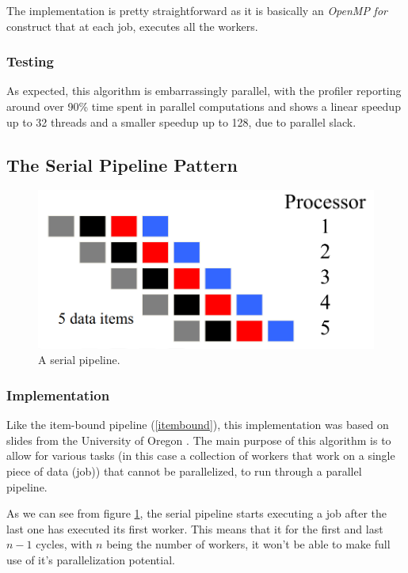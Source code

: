 \documentclass[10pt,journal]{IEEEtran}
\begin{document}
The implementation is pretty straightforward as it is basically an \textit{OpenMP} \textit{for} construct that at each job, executes all the workers.

\subsubsection{Testing}

As expected, this algorithm is embarrassingly parallel, with the profiler reporting around over 90\% time spent in parallel computations and shows a linear speedup up to 32 threads and a smaller speedup up to 128, due to parallel slack.

\subsection{The Serial Pipeline Pattern}

\begin{figure}[htbp]
	\centerline{\includegraphics[scale=0.15]{img/serialpipeline.png}}
	\caption{ A serial pipeline. \cite{pipelineoregon} }
	\label{serialpipe}
\end{figure}

\subsubsection{Implementation}

Like the item-bound pipeline (\ref{itembound}), this implementation was based on slides  from the University of Oregon \cite{pipelineoregon}. The main purpose of this algorithm is to allow for various tasks (in this case a collection of workers that work on a single piece of data (job)) that cannot be parallelized, to run through a parallel pipeline. 

As we can see from figure \ref{serialpipe}, the serial pipeline starts executing a job after the last one has executed its first worker. This means that it for the first and last $ n - 1 $ cycles, with $ n $ being the number of workers, it won't be able to make full use of it's parallelization potential. 
\end{document}
